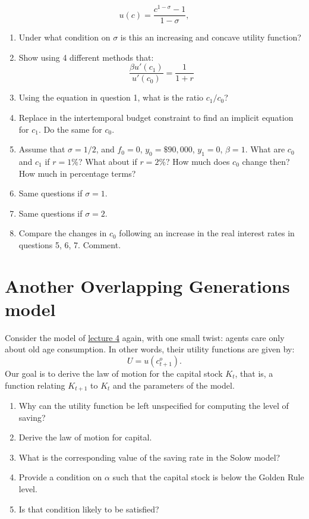 \documentclass[]{book}
\theoremstyle{definition}
\theoremstyle{definition}
\theoremstyle{definition}
\theoremstyle{remark}
\begin{document}
\[u(c) = \frac{c^{1-\sigma}-1}{1-\sigma},\]

\begin{enumerate}
\def\labelenumi{\arabic{enumi}.}
\item
  Under what condition on \(\sigma\) is this an increasing and concave
  utility function?
\item
  Show using 4 different methods that:
  \[\frac{\beta u'(c_{1})}{u'(c_{0})}=\frac{1}{1+r}\]
\item
  Using the equation in question 1, what is the ratio \(c_1/c_0\)?
\item
  Replace in the intertemporal budget constraint to find an implicit
  equation for \(c_1\). Do the same for \(c_0\).
\item
  Assume that \(\sigma = 1/2\), and \(f_0=0\), \(y_0=\$90,000\),
  \(y_1=0\), \(\beta = 1\). What are \(c_0\) and \(c_1\) if \(r=1\%\)?
  What about if \(r=2\%\)? How much does \(c_0\) change then? How much
  in percentage terms?
\item
  Same questions if \(\sigma = 1\).
\item
  Same questions if \(\sigma = 2\).
\item
  Compare the changes in \(c_0\) following an increase in the real
  interest rates in questions 5, 6, 7. Comment.
\end{enumerate}

\section{Another Overlapping Generations
model}\label{another-overlapping-generations-model}

Consider the model of \protect\hyperlink{olg}{lecture 4} again, with one
small twist: agents care only about old age consumption. In other words,
their utility functions are given by: \[U=u(c_{t+1}^{o}).\] Our goal is
to derive the law of motion for the capital stock \(K_t\), that is, a
function relating \(K_{t+1}\) to \(K_t\) and the parameters of the
model.

\begin{enumerate}
\def\labelenumi{\arabic{enumi}.}
\item
  Why can the utility function be left unspecified for computing the
  level of saving?
\item
  Derive the law of motion for capital.
\item
  What is the corresponding value of the saving rate in the Solow model?
\item
  Provide a condition on \(\alpha\) such that the capital stock is below
  the Golden Rule level.
\item
  Is that condition likely to be satisfied?
\end{enumerate}
\end{document}

